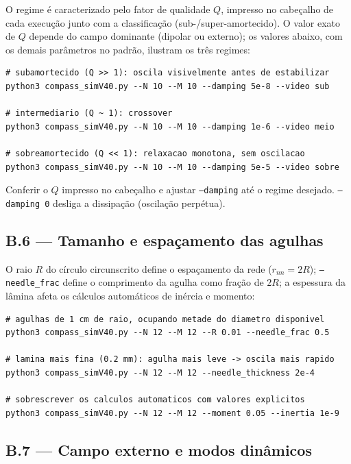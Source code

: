 \documentclass[11pt,a4paper]{article}
\newcommand{\code}[1]{\texttt{#1}}
\begin{document}
O regime é caracterizado pelo fator de qualidade $Q$, impresso no
cabeçalho de cada execução junto com a classificação
(sub-/super-amortecido). O valor exato de $Q$ depende do campo
dominante (dipolar ou externo); os valores abaixo, com os demais
parâmetros no padrão, ilustram os três regimes:
\begin{verbatim}
# subamortecido (Q >> 1): oscila visivelmente antes de estabilizar
python3 compass_simV40.py --N 10 --M 10 --damping 5e-8 --video sub

# intermediario (Q ~ 1): crossover
python3 compass_simV40.py --N 10 --M 10 --damping 1e-6 --video meio

# sobreamortecido (Q << 1): relaxacao monotona, sem oscilacao
python3 compass_simV40.py --N 10 --M 10 --damping 5e-5 --video sobre
\end{verbatim}
Conferir o $Q$ impresso no cabeçalho e ajustar \code{--damping} até o
regime desejado. \code{--damping 0} desliga a dissipação (oscilação
perpétua).

\subsection*{B.6 --- Tamanho e espaçamento das agulhas}

O raio $R$ do círculo circunscrito define o espaçamento da rede
($r_{nn} = 2R$); \code{--needle\_frac} define o comprimento da agulha
como fração de $2R$; a espessura da lâmina afeta os cálculos
automáticos de inércia e momento:
\begin{verbatim}
# agulhas de 1 cm de raio, ocupando metade do diametro disponivel
python3 compass_simV40.py --N 12 --M 12 --R 0.01 --needle_frac 0.5

# lamina mais fina (0.2 mm): agulha mais leve -> oscila mais rapido
python3 compass_simV40.py --N 12 --M 12 --needle_thickness 2e-4

# sobrescrever os calculos automaticos com valores explicitos
python3 compass_simV40.py --N 12 --M 12 --moment 0.05 --inertia 1e-9
\end{verbatim}

\subsection*{B.7 --- Campo externo e modos dinâmicos}
\end{document}
